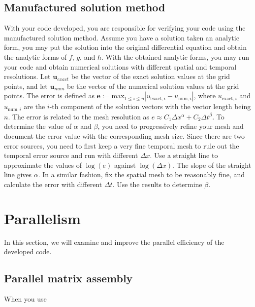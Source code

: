 \documentclass[12pt]{article}
\begin{document}
\subsection{Manufactured solution method}
With your code developed, you are responsible for verifying your code using the manufactured solution method. Assume you have a solution taken an analytic form, you may put the solution into the original differential equation and obtain the analytic forms of $f$, $g$, and $h$. With the obtained analytic forms, you may run your code and obtain numerical solutions with different spatial and temporal resolutions. Let $\bm u_{exact}$ be the vector of the exact solution values at the grid points, and let $\bm u_{num}$ be the vector of the numerical solution values at the grid points. The error is defined as $\bm e := \mathrm{max}_{1 \leq i \leq n} |  u_{\mathrm{exact}, i} -  u_{\mathrm{num}, i}| $, where $u_{\mathrm{exact}, i}$ and $u_{\mathrm{num}, i}$ are the $i$-th component of the solution vectors with the vector length being $n$. The error is related to the mesh resolution as $e \approx C_1 \Delta x^{\alpha} + C_2 \Delta t^{\beta}$. To determine the value of $\alpha$ and $\beta$, you need to progressively refine your mesh and document the error value with the corresponding mesh size. Since there are two error sources, you need to first keep a very fine temporal mesh to rule out the temporal error source and run with different $\Delta x$. Use a straight line to approximate the values of $\log(e)$ against $\log(\Delta x)$. The slope of the straight line gives $\alpha$. In a similar fashion, fix the spatial mesh to be reasonably fine, and calculate the error with different $\Delta t$. Use the results to determine $\beta$.

\section{Parallelism}
In this section, we will examine and improve the parallel efficiency of the developed code.

\subsection{Parallel matrix assembly}
When you use 
\end{document}
